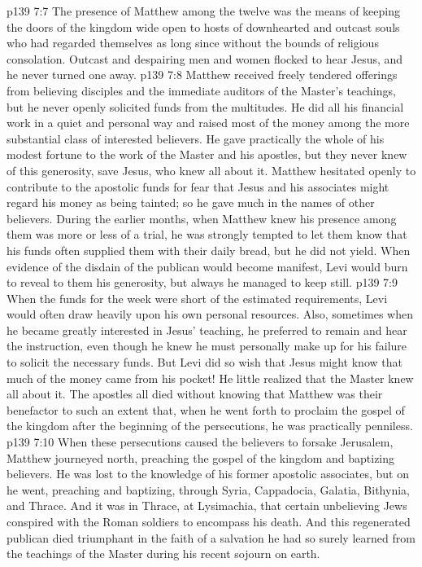 \vs p139 7:7 The presence of Matthew among the twelve was the means of keeping the doors of the kingdom wide open to hosts of downhearted and outcast souls who had regarded themselves as long since without the bounds of religious consolation. Outcast and despairing men and women flocked to hear Jesus, and he never turned one away.
\pc \vs p139 7:8 Matthew received freely tendered offerings from believing disciples and the immediate auditors of the Master’s teachings, but he never openly solicited funds from the multitudes. He did all his financial work in a quiet and personal way and raised most of the money among the more substantial class of interested believers. He gave practically the whole of his modest fortune to the work of the Master and his apostles, but they never knew of this generosity, save Jesus, who knew all about it. Matthew hesitated openly to contribute to the apostolic funds for fear that Jesus and his associates might regard his money as being tainted; so he gave much in the names of other believers. During the earlier months, when Matthew knew his presence among them was more or less of a trial, he was strongly tempted to let them know that his funds often supplied them with their daily bread, but he did not yield. When evidence of the disdain of the publican would become manifest, Levi would burn to reveal to them his generosity, but always he managed to keep still.
\vs p139 7:9 When the funds for the week were short of the estimated requirements, Levi would often draw heavily upon his own personal resources. Also, sometimes when he became greatly interested in Jesus’ teaching, he preferred to remain and hear the instruction, even though he knew he must personally make up for his failure to solicit the necessary funds. But Levi did so wish that Jesus might know that much of the money came from his pocket! He little realized that the Master knew all about it. The apostles all died without knowing that Matthew was their benefactor to such an extent that, when he went forth to proclaim the gospel of the kingdom after the beginning of the persecutions, he was practically penniless.\plusone
\pc \vs p139 7:10 When these persecutions caused the believers to forsake Jerusalem, Matthew journeyed north, preaching the gospel of the kingdom and baptizing believers. He was lost to the knowledge of his former apostolic associates, but on he went, preaching and baptizing, through Syria, Cappadocia, Galatia, Bithynia, and Thrace. And it was in Thrace, at Lysimachia, that certain unbelieving Jews conspired with the Roman soldiers to encompass his death. And this regenerated publican died triumphant in the faith of a salvation he had so surely learned from the teachings of the Master during his recent sojourn on earth.
